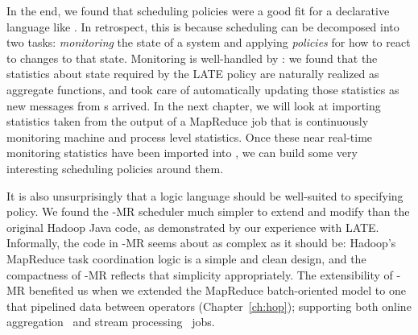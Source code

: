 In the end, we found that scheduling policies were a good fit for a declarative
language like \OVERLOG.  In retrospect, this is because scheduling can be
decomposed into two tasks: {\em monitoring} the state of a system and applying
{\em policies} for how to react to changes to that state.  Monitoring is
well-handled by \OVERLOG: we found that the statistics about {\TT} state
required by the LATE policy are naturally realized as aggregate functions, and
\JOL took care of automatically updating those statistics as new messages from
{\TT}s arrived.  In the next chapter, we will look at importing statistics
taken from the output of a MapReduce job that is continuously monitoring
machine and process level statistics.  Once these near real-time monitoring
statistics have been imported into \JOL, we can build some very interesting
scheduling policies around them.

It is also unsurprisingly that a logic language should be well-suited to
specifying policy.  We found the \BOOM-MR scheduler much simpler to extend and
modify than the original Hadoop Java code, as demonstrated by our experience
with LATE\@.  Informally, the \OVERLOG code in \BOOM-MR seems about as complex
as it should be: Hadoop's MapReduce task coordination logic is a simple and
clean design, and the compactness of \BOOM-MR reflects that simplicity
appropriately.  The extensibility of \BOOM-MR benefited us when we extended the
MapReduce batch-oriented model to one that pipelined data between operators
(Chapter~\ref{ch:hop}); supporting both online aggregation~\cite{onlineagg} and
stream processing~\cite{stream} jobs.  

